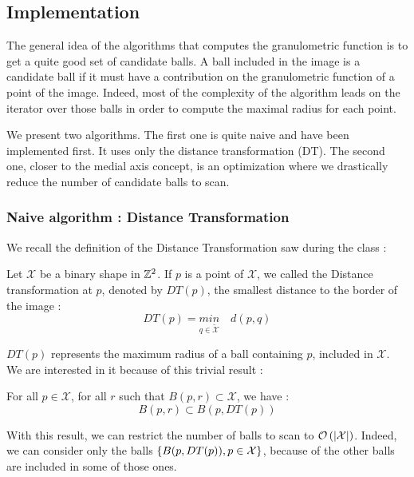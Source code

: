 

\subsection{Implementation}

The general idea of the algorithms that computes the granulometric function is to get a quite good set of candidate balls. A ball included in the image is a candidate ball if it must have a contribution on the granulometric function of a point of the image. Indeed, most of the complexity of the algorithm leads on the iterator over those balls in order to compute the maximal radius for each point. 

We present two algorithms. The first one is quite naive and have been implemented first. It uses only the distance transformation (DT). The second one, closer to the medial axis concept, is an optimization where we drastically reduce the number of candidate balls to scan.

\subsubsection{Naive algorithm : Distance Transformation}

We recall the definition of the Distance Transformation saw during the class :

\begin{defi}
Let $\mathcal{X}$ be a binary shape in $\mathbb{Z}^{2}$. If $p$ is a point of $\mathcal{X}$, we called the Distance transformation at $p$, denoted by $DT(p)$, the smallest distance to the border of the image :
$$ DT(p) = \underset{q \in \widetilde{\mathcal{X}}}{min} \quad d(p,q) $$
\end{defi}

$DT(p)$ represents the maximum radius of a ball containing $p$, included in $\mathcal{X}$. We are interested in it because of this trivial result :

\begin{theo}
	For all $p \in \mathcal{X}$, for all $r$ such that $B(p,r) \subset \mathcal{X}$, we have :
		$$ B(p,r) \subset B(p,DT(p))$$
\end{theo}

With this result, we can restrict the number of balls to scan to $\mathcal O \left( \left| \mathcal{X} \right| \right)$. Indeed, we can consider only the balls $\left\{ B(p,DT(p)), p \in \mathcal{X} \right\}$, because of the other balls are included in some of those ones.

